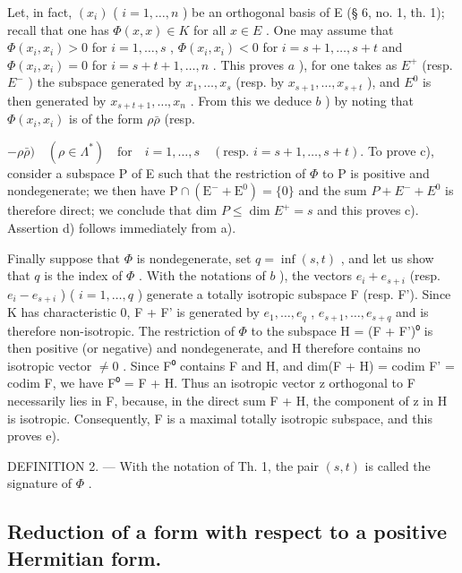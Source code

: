 Let, in fact, \((x_{i})\) ( \(i = 1, \ldots, n\) ) be an orthogonal basis of E (§ 6, no. 1, th. 1); recall that one has \(\Phi(x, x) \in K\) for all \(x \in E\) . One may assume that \(\Phi(x_{i}, x_{i}) > 0\) for \(i = 1, \ldots, s\) , \(\Phi(x_{i}, x_{i}) < 0\) for \(i = s + 1, \ldots, s + t\) and \(\Phi(x_{i}, x_{i}) = 0\) for \(i = s + t + 1, \ldots, n\) . This proves \(a\) ), for one takes as \(E^{+}\) (resp. \(E^{-}\) ) the subspace generated by \(x_{1}, \ldots, x_{s}\) (resp. by \(x_{s+1}, \ldots, x_{s+t}\) ), and \(E^{0}\) is then generated by \(x_{s+t+1}, \ldots, x_{n}\) . From this we deduce \(b\) ) by noting that \(\Phi(x_{i}, x_{i})\) is of the form \(\rho\bar{\rho}\) (resp.

\(-\rho\bar{\rho}) \quad (\rho\in\Lambda^{*}) \quad \text{for} \quad i=1,\ldots,s \quad (\text{resp. } i=s+1,\ldots,s+t).\) To prove c), consider a subspace P of E such that the restriction of \(\Phi\) to P is positive and nondegenerate; we then have \(\mathrm{P}\cap(\mathrm{E}^{-}+\mathrm{E}^{0})=\{0\}\) and the sum \(P+E^{-}+E^{0}\) is therefore direct; we conclude that dim \(P\leqslant\dim E^{+}=s\) and this proves c). Assertion d) follows immediately from a).

Finally suppose that \(\Phi\) is nondegenerate, set \(q = \inf (s, t)\) , and let us show that \(q\) is the index of \(\Phi\) . With the notations of \(b\) ), the vectors \(e_i + e_{s+i}\) (resp. \(e_i - e_{s+i}\) ) ( \(i = 1, \ldots, q\) ) generate a totally isotropic subspace F (resp. F'). Since K has characteristic 0, F + F' is generated by \(e_1, \ldots, e_q\) , \(e_{s+1}, \ldots, e_{s+q}\) and is therefore non-isotropic. The restriction of \(\Phi\) to the subspace H = (F + F')⁰ is then positive (or negative) and nondegenerate, and H therefore contains no isotropic vector \(\neq 0\) . Since F⁰ contains F and H, and dim(F + H) = codim F' = codim F, we have F⁰ = F + H. Thus an isotropic vector z orthogonal to F necessarily lies in F, because, in the direct sum F + H, the component of z in H is isotropic. Consequently, F is a maximal totally isotropic subspace, and this proves e).

DEFINITION 2. --- With the notation of Th. 1, the pair \((s,t)\) is called the signature of \(\Phi\) .

\subsection{Reduction of a form with respect to a positive Hermitian form.}

